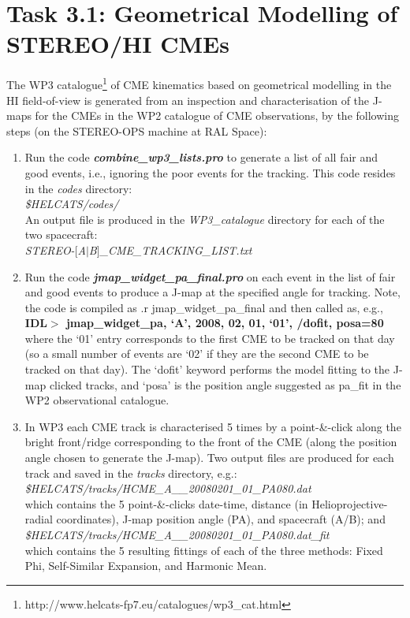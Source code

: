 \documentclass[12pt, a4paper, oneside]{article}
\begin{document}
\newpage

\section*{\sc Task 3.1: Geometrical Modelling of STEREO/HI CMEs}

The WP3 catalogue\footnote{http://www.helcats-fp7.eu/catalogues/wp3\_cat.html} of CME kinematics based on geometrical modelling in the HI field-of-view is generated from an inspection and characterisation of the J-maps for the CMEs in the WP2 catalogue of CME observations, by the following steps (on the STEREO-OPS machine at RAL Space):

\begin{enumerate}

\item Run the code {\bf \textit{combine\_wp3\_lists.pro}} to generate a list of all fair and good events, i.e., ignoring the poor events for the tracking. This code resides in the \textit{codes} directory:\\
\textit{\$HELCATS/codes/}\\
An output file is produced in the \textit{WP3\_catalogue} directory for each of the two spacecraft:\\
\textit{STEREO-$[$A$|$B$]$\_CME\_TRACKING\_LIST.txt}

\item Run the code {\bf \textit{jmap\_widget\_pa\_final.pro}} on each event in the list of fair and good events to produce a J-map at the specified angle for tracking. Note, the code is compiled as .r jmap\_widget\_pa\_final and then called as, e.g.,\\
{\bf IDL$>$ jmap\_widget\_pa, `A', 2008, 02, 01, `01', /dofit, posa=80} \\
where the `01' entry corresponds to the first CME to be tracked on that day (so a small number of events are `02' if they are the second CME to be tracked on that day). The `dofit' keyword performs the model fitting to the J-map clicked tracks, and `posa' is the position angle suggested as pa\_fit in the WP2 observational catalogue.

\item In WP3 each CME track is characterised 5 times by a point-\&-click along the bright front/ridge corresponding to the front of the CME (along the position angle chosen to generate the J-map). Two output files are produced for each track and saved in the \textit{tracks} directory, e.g.: \\
\textit{\$HELCATS/tracks/HCME\_A\_\_20080201\_01\_PA080.dat} \\
which contains the 5 point-\&-clicks date-time, distance (in Helioprojective-radial coordinates), J-map position angle (PA), and spacecraft (A/B); and\\
\textit{\$HELCATS/tracks/HCME\_A\_\_20080201\_01\_PA080.dat\_fit} \\
which contains the 5 resulting fittings of each of the three methods: Fixed Phi, Self-Similar Expansion, and Harmonic Mean.


\end{enumerate}
\end{document}
